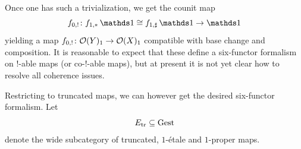 \documentclass[11pt]{book}
\begin{document}
	Once one has such a trivialization, we get the counit map
	\[
		f_{0,!}\colon f_{1,*}\unit \cong f_{1,\sharp}\unit \to \unit
	\]
	yielding a map $f_{0,!}\colon \mathcal{O}(Y)_1 \to \mathcal{O}(X)_1$ compatible with base change and composition. It is reasonable to expect that these define a six-functor formalism on $!$-able maps (or co-$!$-able maps), but at present it is not yet clear how to resolve all coherence issues.

	Restricting to truncated maps, we can however get the desired six-functor formalism. Let
	\[
		E_{\mathrm{tr}}\subseteq{\textup{Gest}}
	\]
	denote the wide subcategory of truncated, $1$-\'etale and $1$-proper maps.

\end{document}
